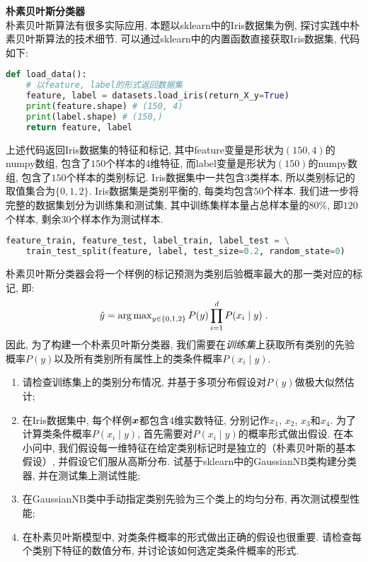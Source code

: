 \documentclass[answers]{exam}  %
\begin{document}
\begin{questions}
	\question [20] \textbf{朴素贝叶斯分类器} \\
	朴素贝叶斯算法有很多实际应用, 本题以sklearn中的Iris数据集为例, 探讨实践中朴素贝叶斯算法的技术细节. 可以通过sklearn中的内置函数直接获取Iris数据集, 代码如下:
	\begin{lstlisting}[language=Python]
def load_data():
    # 以feature, label的形式返回数据集
    feature, label = datasets.load_iris(return_X_y=True)
    print(feature.shape) # (150, 4)
    print(label.shape) # (150,)
    return feature, label
\end{lstlisting}
	上述代码返回Iris数据集的特征和标记, 其中feature变量是形状为$(150, 4)$的numpy数组, 包含了$150$个样本的$4$维特征, 而label变量是形状为$(150)$的numpy数组, 包含了$150$个样本的类别标记. Iris数据集中一共包含$3$类样本, 所以类别标记的取值集合为$\{0,1,2\}$. Iris数据集是类别平衡的, 每类均包含$50$个样本. 我们进一步将完整的数据集划分为训练集和测试集, 其中训练集样本量占总样本量的$80\%$, 即$120$个样本, 剩余$30$个样本作为测试样本.
	\begin{lstlisting}[language=Python]
feature_train, feature_test, label_train, label_test = \
    train_test_split(feature, label, test_size=0.2, random_state=0)
\end{lstlisting}
	朴素贝叶斯分类器会将一个样例的标记预测为类别后验概率最大的那一类对应的标记, 即:
	\begin{equation}
		\hat{y}=\operatorname{arg\,max}_{y\in\{0,1,2\}}P(y)\prod_{i=1}^{d}P(x_i\mid y)\;.
	\end{equation}
	因此, 为了构建一个朴素贝叶斯分类器, 我们需要在{\em 训练集}上获取所有类别的先验概率$P(y)$以及所有类别所有属性上的类条件概率$P(x_i\mid y)$.

	\begin{enumerate}
		\item 请检查训练集上的类别分布情况, 并基于多项分布假设对$P(y)$做极大似然估计;
		\item 在Iris数据集中, 每个样例${\boldsymbol{x}}$都包含$4$维实数特征, 分别记作$x_1$, $x_2$, $x_3$和$x_4$. 为了计算类条件概率$P(x_i\mid y)$, 首先需要对$P(x_i\mid y)$的概率形式做出假设. 在本小问中, 我们假设每一维特征在给定类别标记时是独立的（朴素贝叶斯的基本假设）, 并假设它们服从高斯分布. 试基于sklearn中的GaussianNB类构建分类器, 并在测试集上测试性能;
		\item 在GaussianNB类中手动指定类别先验为三个类上的均匀分布, 再次测试模型性能;
		\item 在朴素贝叶斯模型中, 对类条件概率的形式做出正确的假设也很重要. 请检查每个类别下特征的数值分布, 并讨论该如何选定类条件概率的形式.
	\end{enumerate}


\end{questions}
\end{document}
